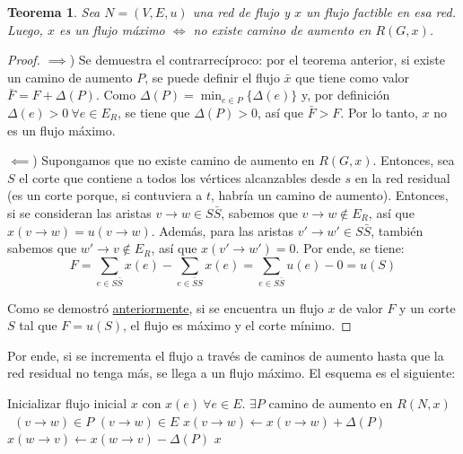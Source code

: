 \documentclass[a4paper]{report}
\newcommand{\Each}{\kw{each}\ }
\newtheorem*{theorem*}{Teorema}
\begin{document}
\begin{theorem*}
    Sea $N = (V, E, u)$ una red de flujo y $x$ un flujo factible en esa red. Luego, $x$ es un flujo máximo $\iff$ no existe camino de aumento en $R(G, x)$.
\end{theorem*}
\begin{proof}
    \leavevmode

    $\implies$) Se demuestra el contrarrecíproco: por el teorema anterior, si existe un camino de aumento $P$, se puede definir el flujo $\bar{x}$ que tiene como valor $\bar{F} = F + \Delta(P)$. Como $\Delta(P) = \min_{e \in P}{\{\Delta(e)\}}$ y, por definición $\Delta(e) > 0\ \forall e \in E_R$, se tiene que $\Delta(P) > 0$, así que $\bar{F} > F$. Por lo tanto, $x$ no es un flujo máximo.

    $\impliedby$) Supongamos que no existe camino de aumento en $R(G, x)$. Entonces, sea $S$ el corte que contiene a todos los vértices alcanzables desde $s$ en la red residual (es un corte porque, si contuviera a $t$, habría un camino de aumento). Entonces, si se consideran las aristas $v \rightarrow w \in S\bar{S}$, sabemos que $v \rightarrow w \notin E_R$, así que $x(v \rightarrow w) = u(v \rightarrow w)$. Además, para las aristas $v' \rightarrow w' \in S\bar{S}$, también sabemos que $w' \rightarrow v \notin E_R$, así que $x(v' \rightarrow w') = 0$. Por ende, se tiene:
    $$F = \sum_{e \in S\bar{S}} x(e) - \sum_{e \in \bar{S}S} x(e) = \sum_{e \in S\bar{S}} u(e) - 0 = u(S)$$

    Como se demostró \hyperref[flujo-certificado-optimalidad]{anteriormente}, si se encuentra un flujo $x$ de valor $F$ y un corte $S$ tal que $F = u(S)$, el flujo es máximo y el corte mínimo.

\end{proof}

Por ende, si se incrementa el flujo a través de caminos de aumento hasta que la red residual no tenga más, se llega a un flujo máximo. El esquema es el siguiente:

\begin{codebox}
    \li Inicializar flujo inicial $x$ con $x(e)\ \forall e \in E$.
    \li \While $\exists P$ camino de aumento en $R(N, x)$ \Do
    \li \For \Each $(v \rightarrow w) \in P$ \Do
    \li \If $(v \rightarrow w) \in E$ \Then
    \li $x(v \rightarrow w) \gets x(v \rightarrow w) + \Delta(P)$
    \li \Else
    \li $x(w \rightarrow v) \gets x(w \rightarrow v) - \Delta(P)$
    \End
    \End
    \End
    \li \Return $x$
\end{codebox}
\end{document}
